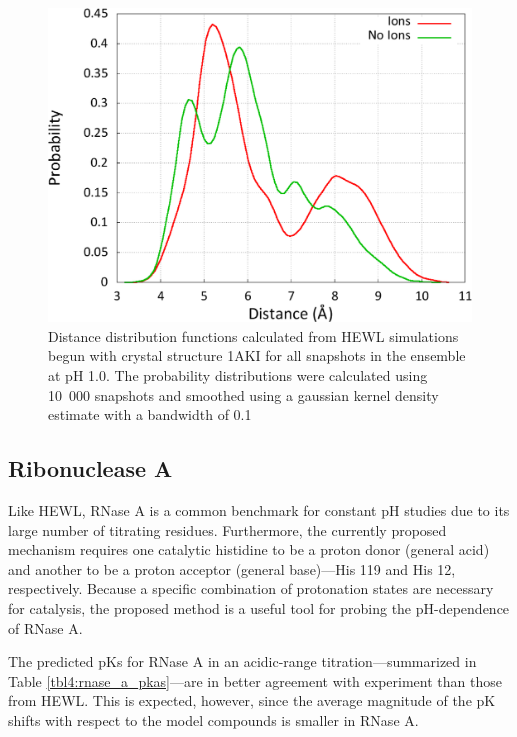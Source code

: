 \begin{figure}
   \includegraphics[width=6.5in]{HEWL_AspArg_Dist_Ion_Comparison.eps}
   \caption{Distance distribution functions calculated from HEWL simulations
            begun with crystal structure 1AKI for all snapshots in the ensemble
            at pH 1.0. The probability distributions were calculated using
            \mbox{10 000} snapshots and smoothed using a gaussian kernel density
            estimate with a bandwidth of 0.1}
   \label{fig4:hewl_asparg_dist}
\end{figure}

\subsection{Ribonuclease A}

Like HEWL, RNase A is a common benchmark for constant pH studies due to its
large number of titrating residues. Furthermore, the currently proposed
mechanism requires one catalytic histidine to be a proton donor (general acid)
and another to be a proton acceptor (general base)---His 119 and His 12,
respectively. Because a specific combination of protonation states are necessary
for catalysis, the proposed method is a useful tool for probing the
pH-dependence of RNase A.

The predicted pKs for RNase A in an acidic-range titration---summarized
in Table \ref{tbl4:rnase_a_pkas}---are in better agreement with experiment than
those from HEWL. This is expected, however, since the average magnitude of the
pK shifts with respect to the model compounds is smaller in RNase A.

